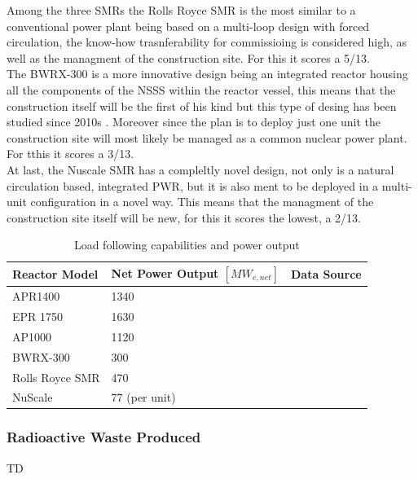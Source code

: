 Among the three SMRs the Rolls Royce SMR is the most similar to a conventional power plant being based on a multi-loop design with forced circulation, the know-how trasnferability for commissioing is considered high, as well as the managment of the construction site. For this it scores a 5/13. \\

The BWRX-300 is a more innovative design being an integrated reactor housing all the components of the NSSS within the reactor vessel, this means that the construction itself will be the first of his kind but this type of desing has been studied since 2010s \cite{PLACEHOLDER}. Moreover since the plan is to deploy just one unit the construction site will most likely be managed as a common nuclear power plant. For tthis it scores a 3/13. \\

At last, the Nuscale SMR has a compleltly novel design, not only is a natural circulation based, integrated PWR, but it is also ment to be deployed in a multi-unit configuration in a novel way. This means that the managment of the construction site itself will be new, for this it scores the lowest, a 2/13. \\



\begin{table}[!ht]
    \centering
    \begin{tabularx}{\textwidth}{l X X}
        \toprule
        \textbf{Reactor Model} & \textbf{Net Power Output $[MW_{e,net}]$} & Data Source\\
        \midrule
        APR1400         & 1340 & \cite{IAEA_PRIS_2025} \\
        EPR 1750        & 1630 & \cite{IAEA_PRIS_2025} \\
        AP1000          & 1120 & \cite{IAEA_PRIS_2025} \\
        BWRX-300        & 300 & \cite{iaea2025aris} \\
        Rolls Royce SMR & 470 & \cite{iaea2025aris} \\
        NuScale         & 77 (per unit) & \cite{iaea2025aris} \\
        \bottomrule
    \end{tabularx}
    \caption{Load following capabilities and power output}
    \label{tab:load-power_output}
\end{table}



\subsubsection{Radioactive Waste Produced}
TD

